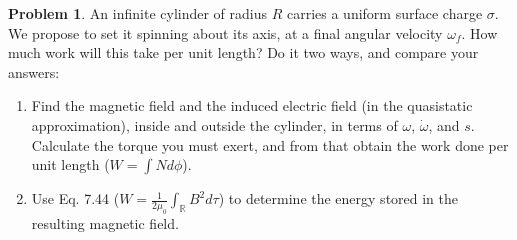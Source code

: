 \documentclass[10pt]{article}
\theoremstyle{definition}
\newtheorem{problem}{Problem}
\begin{document}
\begin{problem}
An infinite cylinder of radius $R$ carries a uniform surface charge $\sigma$.
We propose to set it spinning about its axis, at a final angular velocity $\omega_f$. How much work will this take per unit length?
Do it two ways, and compare your answers:
\begin{enumerate}[label=(\alph*)]
  \item Find the magnetic field and the induced electric field (in the quasistatic approximation),
        inside and outside the cylinder, in terms of $\omega$, $\dot{\omega}$, and $s$. Calculate the torque you must
        exert, and from that obtain the work done per unit length ($W=\int Nd\phi$).
  \item Use Eq. 7.44 ($W=\frac{1}{2\mu_0}\int_{\mathbb{R}}B^2d\tau$) to determine the energy stored in the resulting magnetic field.
\end{enumerate}
\end{problem}
\end{document}
